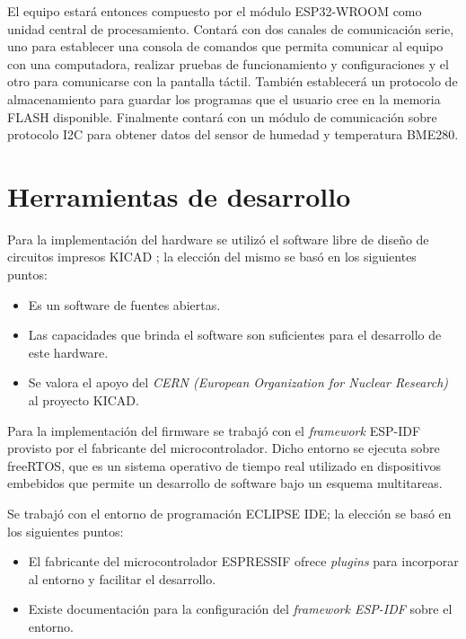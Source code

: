 El equipo estará entonces compuesto por el módulo ESP32-WROOM como unidad central de procesamiento. Contará con dos canales de comunicación serie, uno para establecer una consola de comandos que permita comunicar al equipo con una computadora, realizar pruebas de funcionamiento y configuraciones y el otro para comunicarse con la pantalla táctil. También establecerá un protocolo de almacenamiento para guardar los programas que el usuario cree en la memoria FLASH disponible. Finalmente contará con un módulo de comunicación sobre protocolo I2C para obtener datos del sensor de humedad y temperatura BME280.  


\section{Herramientas de desarrollo}

Para la implementación del hardware se utilizó el software libre de diseño de circuitos impresos KICAD \citep{web_kicad}; la elección del mismo se basó en los siguientes puntos:

\begin{itemize}
\item Es un software de fuentes abiertas.
\item Las capacidades que brinda el software son suficientes para el desarrollo de este hardware.
\item Se valora el apoyo del \textit{CERN (European Organization for Nuclear Research)} \citep{1_nota_web_kicad_cern} al proyecto KICAD.
\end{itemize}


Para la implementación del firmware se trabajó con el \textit{framework} ESP-IDF \citep{web_esp_idf} provisto por el fabricante del microcontrolador. Dicho entorno se ejecuta sobre freeRTOS, que es un sistema operativo de tiempo real utilizado en dispositivos embebidos que permite un desarrollo de software bajo un esquema multitareas.

Se trabajó con el entorno de programación ECLIPSE IDE; la elección se basó en los siguientes puntos:
\begin{itemize}
\item El fabricante del microcontrolador ESPRESSIF ofrece \textit{plugins} para incorporar al entorno y facilitar el desarrollo. 
\item Existe documentación para la configuración del \textit{framework ESP-IDF} \citep{web_esp_idf_eclipse} sobre el entorno.
\end{itemize}
